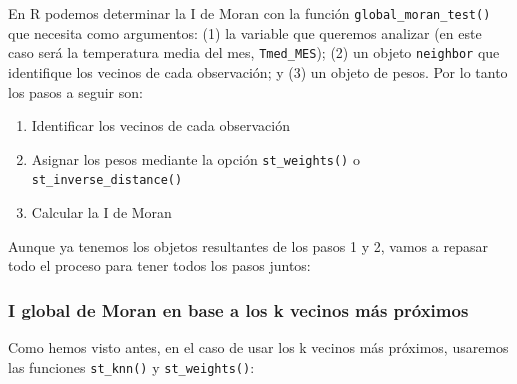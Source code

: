 \documentclass[
  letterpaper,
  DIV=11,
  numbers=noendperiod]{scrreprt}
\newenvironment{Shaded}{\begin{snugshade}}{\end{snugshade}}
\newcommand{\AttributeTok}[1]{\textcolor[rgb]{0.40,0.45,0.13}{#1}}
\newcommand{\CommentTok}[1]{\textcolor[rgb]{0.37,0.37,0.37}{#1}}
\newcommand{\DecValTok}[1]{\textcolor[rgb]{0.68,0.00,0.00}{#1}}
\newcommand{\FunctionTok}[1]{\textcolor[rgb]{0.28,0.35,0.67}{#1}}
\newcommand{\NormalTok}[1]{\textcolor[rgb]{0.00,0.23,0.31}{#1}}
\newcommand{\OtherTok}[1]{\textcolor[rgb]{0.00,0.23,0.31}{#1}}
\newcommand{\SpecialCharTok}[1]{\textcolor[rgb]{0.37,0.37,0.37}{#1}}
\providecommand{\tightlist}{%
  \setlength{\itemsep}{0pt}\setlength{\parskip}{0pt}}\usepackage{longtable,booktabs,array}
\begin{document}
En R podemos determinar la I de Moran con la función
\texttt{global\_moran\_test()} que necesita como argumentos: (1) la
variable que queremos analizar (en este caso será la temperatura media
del mes, \texttt{Tmed\_MES}); (2) un objeto \texttt{neighbor} que
identifique los vecinos de cada observación; y (3) un objeto de pesos.
Por lo tanto los pasos a seguir son:

\begin{enumerate}
\def\labelenumi{\arabic{enumi}.}
\tightlist
\item
  Identificar los vecinos de cada observación
\item
  Asignar los pesos mediante la opción \texttt{st\_weights()} o
  \texttt{st\_inverse\_distance()}
\item
  Calcular la I de Moran
\end{enumerate}

Aunque ya tenemos los objetos resultantes de los pasos 1 y 2, vamos a
repasar todo el proceso para tener todos los pasos juntos:

\hypertarget{i-global-de-moran-en-base-a-los-k-vecinos-muxe1s-pruxf3ximos}{%
\subsubsection{I global de Moran en base a los k vecinos más
próximos}\label{i-global-de-moran-en-base-a-los-k-vecinos-muxe1s-pruxf3ximos}}

Como hemos visto antes, en el caso de usar los k vecinos más próximos,
usaremos las funciones \texttt{st\_knn()} y \texttt{st\_weights()}:

\begin{Shaded}
\end{Shaded}
\end{document}
